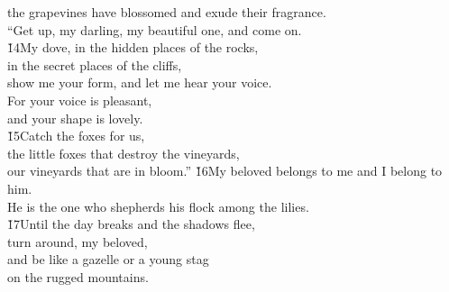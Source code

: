 \begin{poetry}
\poemll    the grapevines have blossomed and exude their fragrance. \\
\poeml ``Get up, my darling, my beautiful one, and come on. \\
\poeml \v{14}My dove, in the hidden places of the rocks, \\
\poemll    in the secret places of the cliffs, \\
\poeml show me your form, and let me hear your voice. \\
\poemll    For your voice is pleasant, \\
\poemlll       and your shape is lovely. \\
\poeml \v{15}Catch the foxes for us, \\
\poemll    the little foxes that destroy the vineyards, \\
\poemlll       our vineyards that are in bloom.''
\poeml \v{16}My beloved belongs to me and I belong to him. \\
\poemll    He is the one who shepherds his flock among the lilies. \\
\poeml \v{17}Until the day breaks and the shadows flee, \\
\poemll    turn around, my beloved, \\
\poeml and be like a gazelle or a young stag \\
\poemll    on the rugged mountains.
\end{poetry}

